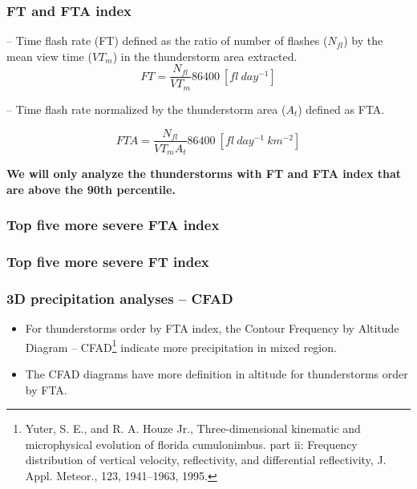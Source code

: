 \documentclass[smaller]{beamer}
\begin{document}
\begin{frame}
\frametitle{}

\end{frame}




\begin{frame}
\frametitle{FT and FTA index}

-- Time flash rate (FT) defined as the ratio of number of flashes ($N_{fl}$) by the mean view time ($VT_m$) in the thunderstorm area extracted.	
\begin{equation}
FT = \frac{N_{fl} }{VT_m} 86400 ~[fl~day^{-1}]    
\end{equation}

-- Time flash rate normalized by the thunderstorm area ($A_t$) defined as FTA. 

\begin{equation}
FTA = \frac{N_{fl} }{VT_m A_t } 86400 ~[fl~day^{-1}~km^{-2}]
\end{equation}

\bigskip
\textbf{We will only analyze the thunderstorms with FT and FTA index that are above the 90th percentile.} 

\end{frame}



\begin{frame}
\frametitle{Top five more severe FTA index}

\end{frame}
\begin{frame}
\frametitle{Top five more severe FT index}

\end{frame}



\begin{frame}
\frametitle{3D precipitation analyses -- CFAD}
\begin{itemize}

\item For thunderstorms order by FTA index, the Contour Frequency by Altitude Diagram -- CFAD\footnote{Yuter, S. E., and R. A. Houze Jr., Three-dimensional kinematic and microphysical evolution of florida cumulonimbus.
part ii: Frequency distribution of vertical velocity, reflectivity, and differential reflectivity, J. Appl. Meteor., 123,
1941–1963, 1995.} indicate more precipitation in mixed region.
\item The CFAD diagrams have more definition in altitude for thunderstorms order by FTA.
\end{itemize}
\end{frame}
  
\end{document}
